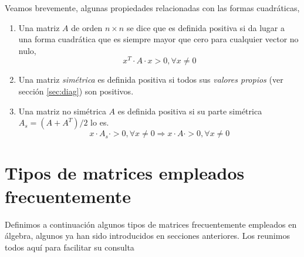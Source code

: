 Veamos brevemente, algunas propiedades relacionadas con  las formas cuadráticas,
\begin{enumerate}
\item Una matriz $A$ de orden $ n\times n$ se dice que es definida positiva si da lugar a una forma cuadrática que es siempre mayor que cero para cualquier vector no nulo,
\begin{equation*}
x^T \cdot A \cdot x > 0, \forall x \neq 0 
\end{equation*}

\item Una matriz \emph{simétrica} es definida positiva si todos sus \emph{valores propios} (ver sección \ref{sec:diag}) son positivos.

\item Una matriz no simétrica $A$ es definida positiva si su parte simétrica $A_s=(A+A^T)/2$ lo es.
\begin{equation*}
x\cdot A_s\cdot >0, \forall x \neq 0 \Rightarrow x\cdot A\cdot >0, \forall x \neq 0
\end{equation*}
\end{enumerate}

\section{Tipos de matrices empleados frecuentemente}\label{tiposm}
Definimos a continuación algunos tipos de matrices frecuentemente empleados en álgebra, algunos ya han sido introducidos en secciones anteriores. Los reunimos todos aquí para facilitar su consulta

